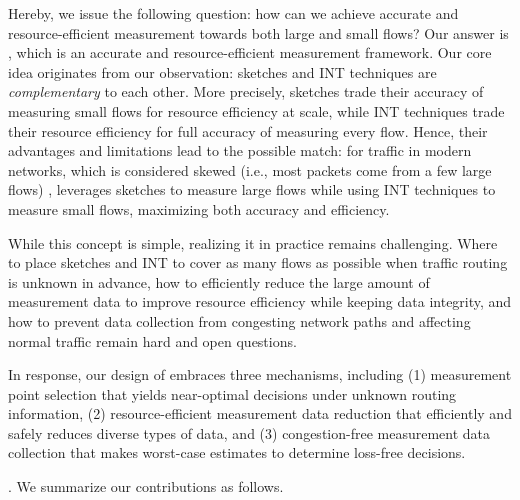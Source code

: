 Hereby, we issue the following question: how can we achieve accurate and resource-efficient measurement towards both large and small flows? Our answer is \sysname, which is an accurate and resource-efficient measurement framework. Our core idea originates from our observation: sketches and INT techniques are \emph{complementary} to each other. More precisely, sketches trade their accuracy of measuring small flows for resource efficiency at scale, while INT techniques trade their resource efficiency for full accuracy of measuring every flow. Hence, their advantages and limitations lead to the possible match: for traffic in modern networks, which is considered skewed (i.e., most packets come from a few large flows) \cite{roy2015inside,huang2021toward,caida,benson2010network,yang2018elastic}, \sysname leverages sketches to measure large flows while using INT techniques to measure small flows, maximizing both accuracy and efficiency.

While this concept is simple, realizing it in practice remains challenging. Where to place sketches and INT to cover as many flows as possible when traffic routing is unknown in advance, how to efficiently reduce the large amount of measurement data to improve resource efficiency while keeping data integrity, and how to prevent data collection from congesting network paths and affecting normal traffic remain hard and open questions. 

In response, our design of \sysname embraces three mechanisms, including (1) measurement point selection that yields near-optimal decisions under unknown routing information, (2) resource-efficient measurement data reduction that efficiently and safely reduces diverse types of data, and (3) congestion-free measurement data collection that makes worst-case estimates to determine loss-free decisions. 

. 
We summarize our contributions as follows.  

